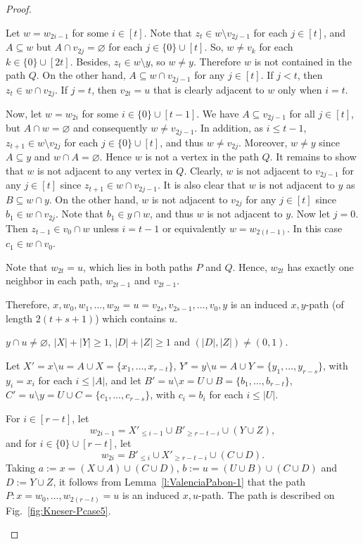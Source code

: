 \documentclass[a4paper,11pt]{article}
\renewcommand{\emptyset}{\varnothing}
\begin{document}
\begin{proof}
\begin{description}
       

        Let $w=w_{2i-1}$ for some $i\in [t]$.
        Note that $z_{t}\in w\setminus v_{2j-1}$ for each $j\in [t]$, and $A \subseteq w$ but $A \cap v_{2j} = \emptyset$ for each $j\in \{0\}\cup [t]$. So, $w\neq v_k$ for each $k\in \{0\}\cup [2t]$. Besides, $z_t \in w\setminus y$, so $w\neq y$. Therefore $w$ is not contained in the path $Q$.
        On the other hand, $A\subseteq w\cap v_{2j-1}$ for any $j \in [t]$. If $j<t$, then  $z_t\in w\cap v_{2j}$. If $j=t$, then $v_{2t}=u$ that is clearly adjacent to $w$ only when $i=t$.

        Now, let $w=w_{2i}$ for some $i\in \{0\}\cup [t-1]$. We have $A\subseteq v_{2j-1}$ for all $j\in [t]$, but $A \cap w = \emptyset$ and consequently $w \neq v_{2j-1}$. In addition, as $i\leq t-1$, $z_{t+1}\in w \setminus v_{2j}$ for each $j\in \{0\}\cup [t]$, and thus $w\neq v_{2j}$. Moreover, $w\neq y$ since $A \subseteq y$ and $w \cap A=\emptyset$. Hence $w$ is not a vertex in the path $Q$. It remains to show that $w$ is not adjacent to any vertex in $Q$. Clearly, $w$ is not adjacent to $v_{2j-1}$ for any $j\in [t]$ since $z_{t+1}\in w\cap v_{2j-1}$. It is also clear that $w$ is not adjacent to $y$ as $B \subseteq w\cap y$. On the other hand, $w$ is not adjacent to $v_{2j}$ for any $j\in [t]$ since $b_1 \in w\cap v_{2j}$. Note that $b_1 \in y \cap w$, and thus $w$ is not adjacent to $y$. Now let $j=0$. Then $z_{t-1} \in v_0 \cap w$ unless $i=t-1$ or equivalently $w=w_{2(t-1)}$. In this case $c_1 \in w \cap v_0$.         

        Note that $w_{2t}=u$, which lies in both paths $P$ and $Q$. Hence, $w_{2t}$ has exactly one neighbor in each path, $w_{2t-1}$ and $v_{2t-1}$. 

        Therefore, $x,w_0,w_1,\ldots,w_{2t}=u=v_{2s},v_{2s-1},\ldots,v_0,y$ is an induced $x,y$-path (of length $2(t+s+1)$) which contains $u$.
      

        
        \item[Case 5.] $y\cap u\neq \emptyset$, $|X|+|Y|\geq 1$, $|D|+|Z|\geq 1$ and $(|D|,|Z|)\neq (0,1)$.
        
        Let $X'=x\setminus u=A\cup X=\{x_1,\ldots,x_{r-t}\}$, $Y'=y\setminus u=A\cup Y=\{y_1,\ldots,y_{r-s}\}$, with $y_i=x_i$ for each $i\leq |A|$, and let $B'=u\setminus x=U\cup B=\{b_1,\ldots,b_{r-t}\}$, $C'=u\setminus y=U\cup C=\{c_1,\ldots,c_{r-s}\}$, with $c_{i}=b_{i}$ for each $i\leq |U|$.

        For $i \in [r-t]$, let
        $$w_{2i-1}=X'_{\leq i-1} \cup B'_{\geq r-t-i} \cup (Y\cup Z),$$
        and for $i \in \{0\}\cup[r-t]$, let
        $$w_{2i}=B'_{\leq i} \cup X'_{\geq r-t-i} \cup (C\cup D).$$
        Taking $a:=x=(X\cup A)\cup (C\cup D)$, $b:=u=(U\cup B)\cup (C\cup D)$ and $D:=Y\cup Z$, it follows from Lemma~\ref{l:ValenciaPabon-1} that the path $P:x=w_0,\ldots,w_{2(r-t)}=u$ is an induced $x,u$-path. The path is described on Fig.~\ref{fig:Kneser-Pcase5}.


\end{description}
\end{proof}
\end{document}
